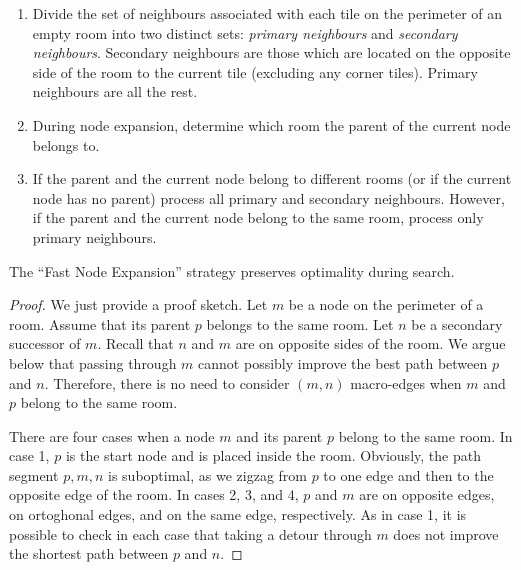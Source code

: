 
\begin{enumerate}
\item{Divide the set of neighbours associated with each tile on the perimeter of an empty room into two distinct sets:
\emph{primary neighbours} and \emph{secondary neighbours}.
Secondary neighbours are those which are located on the opposite side of the
room to the current tile  (excluding any corner tiles).
Primary neighbours are all the rest.}
\item{During node expansion, determine which room the parent of the current node belongs to.}
\item{If the parent and the current node belong to different rooms (or if the current node has no parent) 
process all primary and secondary neighbours.
However, if the parent and the current node belong to the same room, process only primary neighbours.}
\end{enumerate}

\begin{lemma}
The ``Fast Node Expansion'' strategy preserves optimality during search.
\end{lemma}
\begin{proof}
We just provide a proof sketch. 
Let $m$ be a node on the perimeter of a room. Assume that its parent $p$ belongs
to the same room.
Let $n$ be a secondary successor of $m$.
Recall that $n$ and $m$ are on opposite sides of the room.
We argue below that passing through $m$ cannot possibly improve the 
best path between $p$ and $n$.
Therefore, there is no need to consider $(m,n)$ macro-edges
when $m$ and $p$ belong to the same room.

There are four cases when a node $m$ and its parent $p$ belong to the
same room. In case 1, $p$ is the start node and is placed inside the room.
Obviously, the path segment $p,m,n$ is suboptimal, as we zigzag from $p$ to one
edge and then to the opposite edge of the room.
In cases 2, 3, and 4, $p$ and $m$ are on opposite edges, on ortoghonal edges, and on the same
edge, respectively. As in case 1, it is possible to check in each case that
taking a detour through $m$ does not improve the shortest path between $p$ and $n$.
\end{proof}

